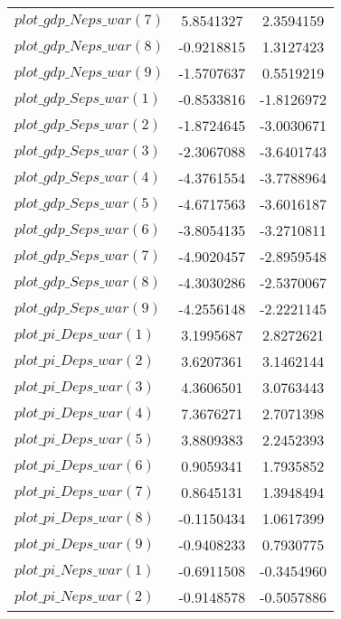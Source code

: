 \begin{center}
\begin{longtable}{lcc}
$plot\_gdp\_N eps\_war (7)  $	 & 	      5.8541327	 & 	      2.3594159 \\ 
$plot\_gdp\_N eps\_war (8)  $	 & 	     -0.9218815	 & 	      1.3127423 \\ 
$plot\_gdp\_N eps\_war (9)  $	 & 	     -1.5707637	 & 	      0.5519219 \\ 
$plot\_gdp\_S eps\_war (1)  $	 & 	     -0.8533816	 & 	     -1.8126972 \\ 
$plot\_gdp\_S eps\_war (2)  $	 & 	     -1.8724645	 & 	     -3.0030671 \\ 
$plot\_gdp\_S eps\_war (3)  $	 & 	     -2.3067088	 & 	     -3.6401743 \\ 
$plot\_gdp\_S eps\_war (4)  $	 & 	     -4.3761554	 & 	     -3.7788964 \\ 
$plot\_gdp\_S eps\_war (5)  $	 & 	     -4.6717563	 & 	     -3.6016187 \\ 
$plot\_gdp\_S eps\_war (6)  $	 & 	     -3.8054135	 & 	     -3.2710811 \\ 
$plot\_gdp\_S eps\_war (7)  $	 & 	     -4.9020457	 & 	     -2.8959548 \\ 
$plot\_gdp\_S eps\_war (8)  $	 & 	     -4.3030286	 & 	     -2.5370067 \\ 
$plot\_gdp\_S eps\_war (9)  $	 & 	     -4.2556148	 & 	     -2.2221145 \\ 
$plot\_pi\_D eps\_war (1)   $	 & 	      3.1995687	 & 	      2.8272621 \\ 
$plot\_pi\_D eps\_war (2)   $	 & 	      3.6207361	 & 	      3.1462144 \\ 
$plot\_pi\_D eps\_war (3)   $	 & 	      4.3606501	 & 	      3.0763443 \\ 
$plot\_pi\_D eps\_war (4)   $	 & 	      7.3676271	 & 	      2.7071398 \\ 
$plot\_pi\_D eps\_war (5)   $	 & 	      3.8809383	 & 	      2.2452393 \\ 
$plot\_pi\_D eps\_war (6)   $	 & 	      0.9059341	 & 	      1.7935852 \\ 
$plot\_pi\_D eps\_war (7)   $	 & 	      0.8645131	 & 	      1.3948494 \\ 
$plot\_pi\_D eps\_war (8)   $	 & 	     -0.1150434	 & 	      1.0617399 \\ 
$plot\_pi\_D eps\_war (9)   $	 & 	     -0.9408233	 & 	      0.7930775 \\ 
$plot\_pi\_N eps\_war (1)   $	 & 	     -0.6911508	 & 	     -0.3454960 \\ 
$plot\_pi\_N eps\_war (2)   $	 & 	     -0.9148578	 & 	     -0.5057886 \\ 

\end{longtable}
\end{center}

